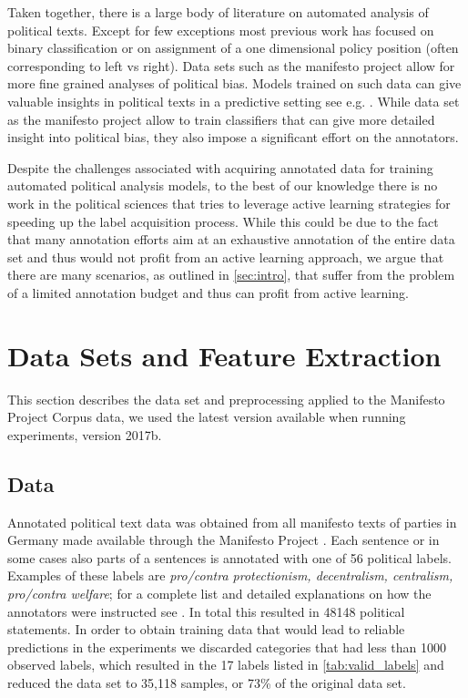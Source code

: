 \documentclass[runningheads,a4paper]{article}
\begin{document}
Taken together, there is a large body of literature on automated analysis of political texts. Except for few exceptions most previous work has focused on binary classification or on assignment of a one dimensional policy position (often corresponding to left vs right). Data sets such as the manifesto project allow for more fine grained analyses of political bias. Models trained on such data can give valuable insights in political texts in a predictive setting see e.g. \cite{Merz2016,Biessmann16}. While data set as the manifesto project allow to train classifiers that can give more detailed insight into political bias, they also impose a significant effort on the annotators. 

Despite the challenges associated with acquiring annotated data for training automated political analysis models, to the best of our knowledge there is no work in the political sciences that tries to leverage active learning strategies for speeding up the label acquisition process. While this could be due to the fact that many annotation efforts aim at an exhaustive annotation of the entire data set and thus would not profit from an active learning approach, we argue that there are many scenarios, as outlined in \autoref{sec:intro}, that suffer from the problem of a limited annotation budget and thus can profit from active learning.

\section{Data Sets and Feature Extraction}\label{sec:data}
%
This section describes the data set and preprocessing applied to the Manifesto Project Corpus data, we used the latest version available when running experiments, version 2017b. 
\subsection{Data}
Annotated political text data was obtained from all manifesto texts of parties in Germany made available through the Manifesto Project \cite{manifesto}. 
Each sentence or in some cases also parts of a sentences is annotated with one of 56 political labels. Examples of these labels are {\em pro/contra protectionism, decentralism, centralism, pro/contra welfare}; for a complete list and detailed explanations on how the annotators were instructed see \cite{leftright}. In total this resulted in 48148 political statements. In order to obtain training data that would lead to reliable predictions in the experiments we discarded categories that had less than 1000 observed labels, which resulted in the 17 labels listed in \autoref{tab:valid_labels} and reduced the data set to 35,118 samples, or 73\% of the original data set.
\end{document}
